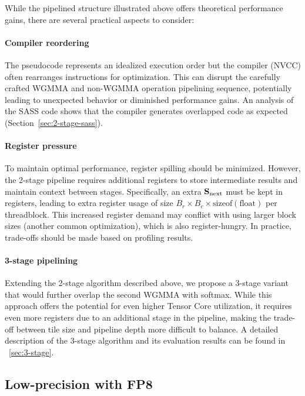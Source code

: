   While the pipelined structure illustrated above offers theoretical performance gains, there are several practical aspects to consider:
  \paragraph{Compiler reordering}
  The pseudocode represents an idealized execution order but the compiler (NVCC) often rearranges instructions for optimization.
  This can disrupt the carefully crafted WGMMA and non-WGMMA operation pipelining sequence, potentially leading to unexpected behavior or diminished performance gains. An analysis of the SASS code shows that the compiler generates overlapped code as expected (Section~\ref{sec:2-stage-sass}).
  \paragraph{Register pressure}
  To maintain optimal performance, register spilling should be minimized.
  However, the 2-stage pipeline requires additional registers to store intermediate results and maintain context between stages.
  Specifically, an extra $\mathbf{S}_{\mathrm{next}}$ must be kept in registers, leading to extra register usage of size $B_r \times B_c \times \text{sizeof}(\text{float})$ per threadblock.
  This increased register demand may conflict with using larger block sizes (another common optimization), which is also register-hungry.
  In practice, trade-offs should be made based on profiling results.
  \paragraph{3-stage pipelining} Extending the 2-stage algorithm described above, we propose a 3-stage variant
  that would further overlap the second WGMMA with softmax.
  While this approach offers the potential for even higher Tensor Core utilization,
  it requires even more registers due to an additional stage in the pipeline,
  making the trade-off between tile size and pipeline depth more difficult to balance.
  A detailed description of the 3-stage algorithm and its evaluation results can be found in ~\cref{sec:3-stage}.

\subsection{Low-precision with FP8}
\label{sec:algofp8}

